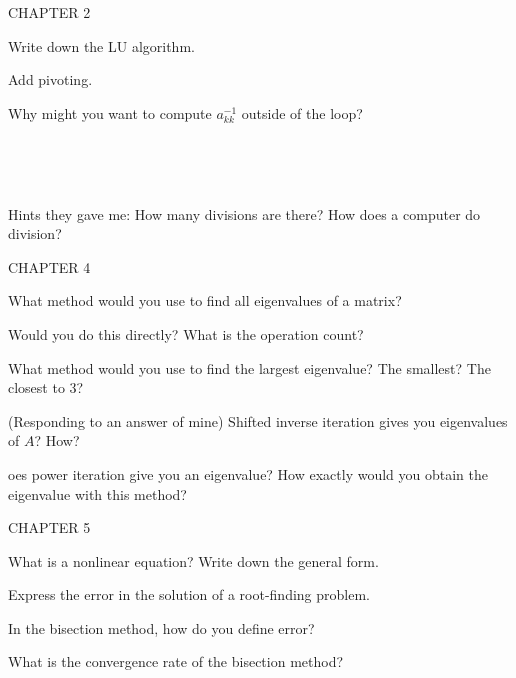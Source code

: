 \documentclass[12pt]{article}
\newenvironment{problem}[2][Problem]{\begin{trivlist}
\item[\hskip \labelsep {\bfseries #1}\hskip \labelsep {\bfseries #2.}]}{\end{trivlist}}
\begin{document}
CHAPTER 2

\begin{problem}{}
Write down the LU algorithm.
\end{problem}

\begin{problem}{}
Add pivoting.
\end{problem}

\begin{problem}{}
Why might you want to compute $a_{kk}^{-1}$ outside of the loop?

\ 

\ 

Hints they gave me: How many divisions are there?  How does a computer do division?
\end{problem}

CHAPTER 4

\begin{problem}{}
What method would you use to find all eigenvalues of a matrix?
\end{problem}
\begin{problem}{}
Would you do this directly?  What is the operation count?
\end{problem}
\begin{problem}{}
What method would you use to find the largest eigenvalue?  The smallest?  The closest to 3?
\end{problem}
\begin{problem}{}
(Responding to an answer of mine) Shifted inverse iteration gives you eigenvalues of $A$?  How?
\end{problem}

\begin{problem}
Does power iteration give you an eigenvalue?  How exactly would you obtain the eigenvalue with this method?
\end{problem}

CHAPTER 5

\begin{problem}{}
What is a nonlinear equation?  Write down the general form.
\end{problem}

\begin{problem}{}
Express the error in the solution of a root-finding problem.
\end{problem}
\begin{problem}{}
In the bisection method, how do you define error?
\end{problem}

\begin{problem}{}
What is the convergence rate of the bisection method?
\end{problem}
\end{document}

